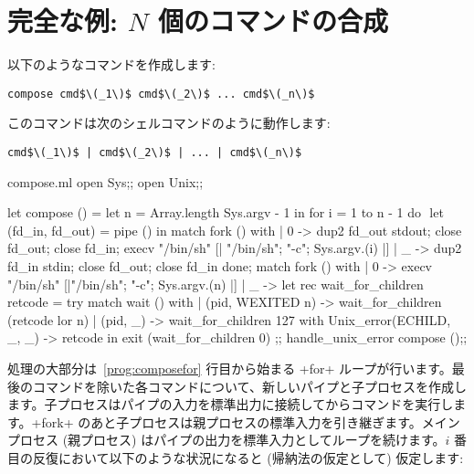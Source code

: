 \section{完全な例: $N$ 個のコマンドの合成}

以下のようなコマンドを作成します:
\begin{lstlisting}
compose cmd$\(_1\)$ cmd$\(_2\)$ ... cmd$\(_n\)$
\end{lstlisting}
このコマンドは次のシェルコマンドのように動作します:
\begin{lstlisting}
cmd$\(_1\)$ | cmd$\(_2\)$ | ... | cmd$\(_n\)$
\end{lstlisting}
\begin{listingcodefile}[style=numbers]{compose.ml}
open Sys;;
open Unix;;

let compose () =
  let n = Array.length Sys.argv - 1 in
  for i = 1 to n - 1 do $\label{prog:composefor}$
    let (fd_in, fd_out) = pipe () in
    match fork () with
    | 0 ->
        dup2 fd_out stdout;
        close fd_out;
        close fd_in;
        execv "/bin/sh" [| "/bin/sh"; "-c"; Sys.argv.(i) |]
    | _ ->
        dup2 fd_in stdin;
        close fd_out;
        close fd_in
  done;
  match fork () with
  | 0 -> execv "/bin/sh" [|"/bin/sh"; "-c"; Sys.argv.(n) |]
  | _ ->
      let rec wait_for_children retcode =
        try
          match wait () with
          | (pid, WEXITED n) -> wait_for_children (retcode lor n)
          | (pid, _)         -> wait_for_children 127
        with
          Unix_error(ECHILD, _, _) -> retcode in
      exit (wait_for_children 0)
;;
handle_unix_error compose ();;
\end{listingcodefile}
%
処理の大部分は~\ref{prog:composefor} 行目から始まる \ml+for+ ループが行います。最後のコマンドを除いた各コマンドについて、新しいパイプと子プロセスを作成します。子プロセスはパイプの入力を標準出力に接続してからコマンドを実行します。\ml+fork+ のあと子プロセスは親プロセスの標準入力を引き継ぎます。メインプロセス (親プロセス) はパイプの出力を標準入力としてループを続けます。$i$ 番目の反復において以下のような状況になると (帰納法の仮定として) 仮定します:
